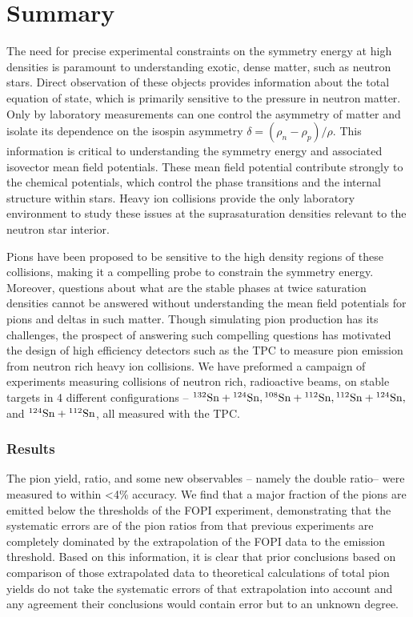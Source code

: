 \chapter{Summary}
\label{chap:summary}

The need for precise experimental constraints on the symmetry energy at high densities is paramount to understanding exotic, dense matter, such as neutron stars. Direct observation of these objects provides information about the total equation of state, which is primarily sensitive to the pressure in neutron matter. Only by laboratory measurements can one control the asymmetry of matter and isolate its dependence on the isospin asymmetry $\delta =(\rho_n - \rho_p)/\rho$. This information is critical to understanding the symmetry energy and associated isovector mean field potentials. These mean field potential contribute strongly to the chemical potentials, which control the phase transitions and the internal structure within stars. Heavy ion collisions provide the only laboratory environment to study these issues at the suprasaturation densities relevant to the neutron star interior.  

Pions have been proposed to be sensitive to the high density regions of these collisions, making it a compelling probe to constrain the symmetry energy. Moreover, questions about what are the stable phases at twice saturation densities cannot be answered without understanding the mean field potentials for pions and deltas in such matter. Though simulating pion production has its challenges, the prospect of answering such compelling questions has motivated the design of high efficiency detectors such as the \spirit TPC to measure pion emission from neutron rich heavy ion collisions. We have preformed a campaign of experiments measuring collisions of neutron rich, radioactive beams, on stable targets in 4 different configurations -- ${}^{132}\mathrm{Sn} + {}^{124}\mathrm{Sn}, {}^{108}\mathrm{Sn} + {}^{112}\mathrm{Sn}, {}^{112}\mathrm{Sn} + {}^{124}\mathrm{Sn},$ and ${}^{124}\mathrm{Sn} + {}^{112}\mathrm{Sn}$, all measured with the \spirit TPC. 

\subsection{Results}
The pion yield, ratio, and some new observables -- namely the double ratio-- were measured to within <4\% accuracy. We find that a major fraction of the pions are emitted below the thresholds of the FOPI experiment, demonstrating that the systematic errors are of the pion ratios from that previous experiments are completely dominated by the extrapolation of the FOPI data to the emission threshold. Based on this information, it is clear that prior conclusions based on comparison of those extrapolated data to theoretical calculations of total pion yields do not take the systematic errors of that extrapolation into account and any agreement their conclusions would contain error but to an unknown degree. 

